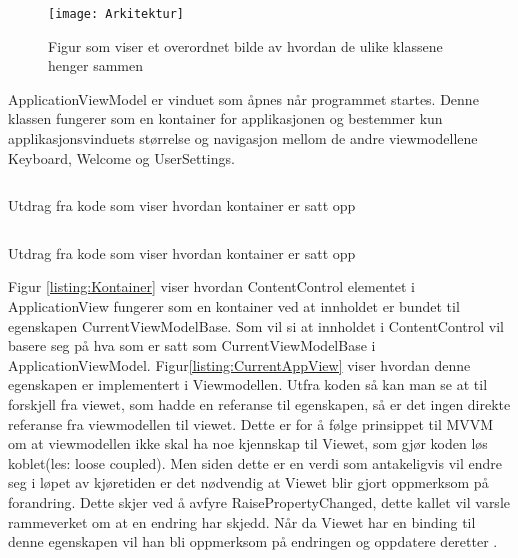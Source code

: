 {\begin{figure}[ht] 
\centering 
\texttt{[image: Arkitektur]} 
\caption{Figur som viser et overordnet bilde av hvordan de ulike klassene henger sammen} 
\label{fig:arkitektur} 
\end{figure} 
 

 
ApplicationViewModel er vinduet som åpnes når programmet startes. Denne klassen fungerer som en kontainer for applikasjonen og bestemmer kun applikasjonsvinduets størrelse og navigasjon mellom de andre viewmodellene Keyboard, Welcome og UserSettings.  
 
 

\begin{listing}[ht] 
\inputminted[fontsize=\footnotesize, frame=lines,framesep=2mm,baselinestretch=1.2,bgcolor=lightgray,linenos]{xml}{Code/ApplicationContainer.xml} 
\caption{Utdrag fra kode som viser hvordan kontainer er satt opp} 
\label{listing:Kontainer} 
\end{listing} 
 
 
\begin{listing}[ht] 
\inputminted[fontsize=\footnotesize, frame=lines,framesep=2mm,baselinestretch=1.2,bgcolor=lightgray,linenos]{csharp}{Code/CurrentApplicationView.cs} 
\caption{Utdrag fra kode som viser hvordan kontainer er satt opp} 
\label{listing:CurrentAppView} 
\end{listing} 
 
 
 
Figur \ref{listing:Kontainer} viser hvordan ContentControl elementet i ApplicationView fungerer som en kontainer ved at innholdet er bundet til egenskapen CurrentViewModelBase. Som vil si at innholdet i ContentControl vil basere seg på hva som er satt som CurrentViewModelBase i ApplicationViewModel. Figur\ref{listing:CurrentAppView} viser hvordan denne egenskapen er implementert i Viewmodellen. Utfra koden så kan man se at til forskjell fra viewet, som hadde en referanse til egenskapen, så er det ingen direkte referanse fra viewmodellen til viewet. Dette er for å følge prinsippet til MVVM om at viewmodellen ikke skal ha noe kjennskap til Viewet, som gjør koden løs koblet(les: loose coupled). Men siden dette er en verdi som antakeligvis vil endre seg i løpet av kjøretiden er det nødvendig at Viewet blir gjort oppmerksom på forandring. Dette skjer ved å avfyre RaisePropertyChanged, dette kallet vil varsle rammeverket om at en endring har skjedd. Når da Viewet har en binding til denne egenskapen vil han bli oppmerksom på endringen og oppdatere deretter \cite{MVVM4:online}. 
 
}
